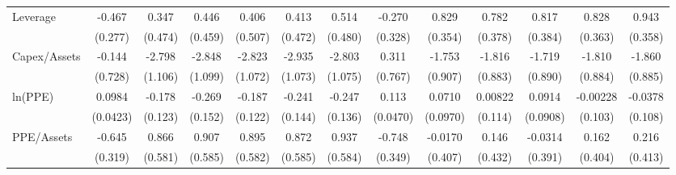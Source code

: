 {\begin{tabular}{l*{12}{c}}
Leverage            &      -0.467\sym{*}  &       0.347         &       0.446         &       0.406         &       0.413         &       0.514         &      -0.270         &       0.829\sym{**} &       0.782\sym{**} &       0.817\sym{**} &       0.828\sym{**} &       0.943\sym{**} \\
                    &     (0.277)         &     (0.474)         &     (0.459)         &     (0.507)         &     (0.472)         &     (0.480)         &     (0.328)         &     (0.354)         &     (0.378)         &     (0.384)         &     (0.363)         &     (0.358)         \\
Capex/Assets        &      -0.144         &      -2.798\sym{**} &      -2.848\sym{**} &      -2.823\sym{**} &      -2.935\sym{***}&      -2.803\sym{**} &       0.311         &      -1.753\sym{*}  &      -1.816\sym{**} &      -1.719\sym{*}  &      -1.810\sym{**} &      -1.860\sym{**} \\
                    &     (0.728)         &     (1.106)         &     (1.099)         &     (1.072)         &     (1.073)         &     (1.075)         &     (0.767)         &     (0.907)         &     (0.883)         &     (0.890)         &     (0.884)         &     (0.885)         \\
ln(PPE)             &      0.0984\sym{**} &      -0.178         &      -0.269\sym{*}  &      -0.187         &      -0.241\sym{*}  &      -0.247\sym{*}  &       0.113\sym{**} &      0.0710         &     0.00822         &      0.0914         &    -0.00228         &     -0.0378         \\
                    &    (0.0423)         &     (0.123)         &     (0.152)         &     (0.122)         &     (0.144)         &     (0.136)         &    (0.0470)         &    (0.0970)         &     (0.114)         &    (0.0908)         &     (0.103)         &     (0.108)         \\
PPE/Assets          &      -0.645\sym{**} &       0.866         &       0.907         &       0.895         &       0.872         &       0.937         &      -0.748\sym{**} &     -0.0170         &       0.146         &     -0.0314         &       0.162         &       0.216         \\
                    &     (0.319)         &     (0.581)         &     (0.585)         &     (0.582)         &     (0.585)         &     (0.584)         &     (0.349)         &     (0.407)         &     (0.432)         &     (0.391)         &     (0.404)         &     (0.413)         \\

\end{tabular}}
